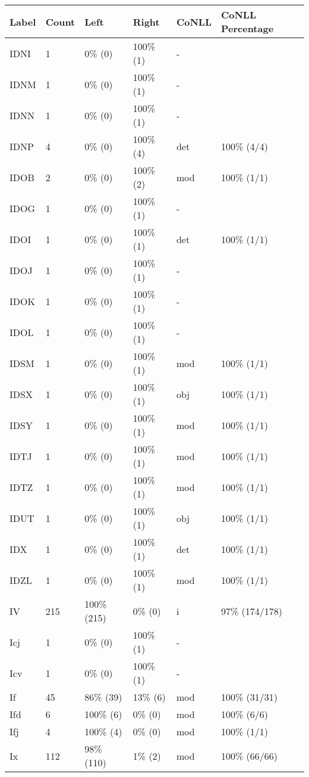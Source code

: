 \begin{figure*}
\begin{tabular}{|l|l|l|l||l|l|}
\hline
Label & Count & Left & Right & CoNLL & CoNLL Percentage\\ 
\hline
 IDNI & 1 & 0\% (0) & 100\% (1) & - &  \\ 
\hline
 IDNM & 1 & 0\% (0) & 100\% (1) & - &  \\ 
\hline
 IDNN & 1 & 0\% (0) & 100\% (1) & - &  \\ 
\hline
 IDNP & 4 & 0\% (0) & 100\% (4) & det & 100\% (4/4) \\ 
\hline
 IDOB & 2 & 0\% (0) & 100\% (2) & mod & 100\% (1/1) \\ 
\hline
 IDOG & 1 & 0\% (0) & 100\% (1) & - &  \\ 
\hline
 IDOI & 1 & 0\% (0) & 100\% (1) & det & 100\% (1/1) \\ 
\hline
 IDOJ & 1 & 0\% (0) & 100\% (1) & - &  \\ 
\hline
 IDOK & 1 & 0\% (0) & 100\% (1) & - &  \\ 
\hline
 IDOL & 1 & 0\% (0) & 100\% (1) & - &  \\ 
\hline
 IDSM & 1 & 0\% (0) & 100\% (1) & mod & 100\% (1/1) \\ 
\hline
 IDSX & 1 & 0\% (0) & 100\% (1) & obj & 100\% (1/1) \\ 
\hline
 IDSY & 1 & 0\% (0) & 100\% (1) & mod & 100\% (1/1) \\ 
\hline
 IDTJ & 1 & 0\% (0) & 100\% (1) & mod & 100\% (1/1) \\ 
\hline
 IDTZ & 1 & 0\% (0) & 100\% (1) & mod & 100\% (1/1) \\ 
\hline
 IDUT & 1 & 0\% (0) & 100\% (1) & obj & 100\% (1/1) \\ 
\hline
 IDX & 1 & 0\% (0) & 100\% (1) & det & 100\% (1/1) \\ 
\hline
 IDZL & 1 & 0\% (0) & 100\% (1) & mod & 100\% (1/1) \\ 
\hline
 IV & 215 & 100\% (215) & 0\% (0) & i & 97\% (174/178) \\ 
\hline
 Icj & 1 & 0\% (0) & 100\% (1) & - &  \\ 
\hline
 Icv & 1 & 0\% (0) & 100\% (1) & - &  \\ 
\hline
 If & 45 & 86\% (39) & 13\% (6) & mod & 100\% (31/31) \\ 
\hline
 Ifd & 6 & 100\% (6) & 0\% (0) & mod & 100\% (6/6) \\ 
\hline
 Ifj & 4 & 100\% (4) & 0\% (0) & mod & 100\% (1/1) \\ 
\hline
 Ix & 112 & 98\% (110) & 1\% (2) & mod & 100\% (66/66) \\ 

\end{tabular}
\end{figure*}
